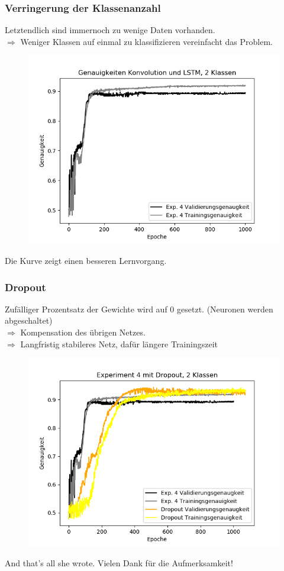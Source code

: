 \documentclass{beamer}
\begin{document}
\frame
{
	\frametitle{Verringerung der Klassenanzahl}
	Letztendlich sind immernoch zu wenige Daten vorhanden.\\
	$\Rightarrow$ Weniger Klassen auf einmal zu klassifizieren vereinfacht das Problem.
	\begin{figure}[h!]
		\centering
		\includegraphics[width=0.5\linewidth,height=0.5\textheight, keepaspectratio]{res/old/conv_lstm.png}
	\end{figure}
	Die Kurve zeigt einen besseren Lernvorgang.
}

\frame
{
	\frametitle{Dropout}
	Zufälliger Prozentsatz der Gewichte wird auf $0$ gesetzt. (Neuronen werden abgeschaltet)\\
	$\Rightarrow$ Kompensation des übrigen Netzes.\\
	$\Rightarrow$ Langfristig stabileres Netz, dafür längere Trainingszeit
	\begin{figure}[h!]
		\centering
		\includegraphics[width=0.5\linewidth,height=0.5\textheight, keepaspectratio]{res/old/dopout.png}
	\end{figure}
}



\frame
{
	\begin{center}
		And that's all she wrote.
		\Large Vielen Dank für die Aufmerksamkeit!
		\normalsize
		\end{center}
}
\end{document}
